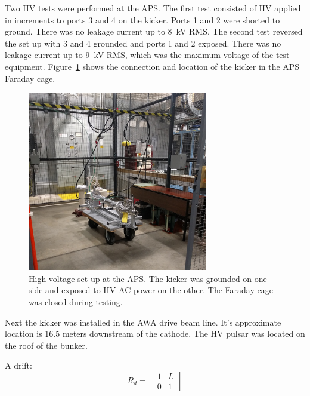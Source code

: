 
Two HV tests were performed at the APS. 
The first test consisted of HV applied in increments to ports 3 and 4 on the kicker.
Ports 1 and 2 were shorted to ground. There was no leakage current up to \SI{8}{kV} RMS.
The second test reversed the set up with 3 and 4 grounded and ports 1 and 2 exposed. 
There was no leakage current up to \SI{9}{kV} RMS, which was the maximum voltage of the test equipment.
Figure~\ref{fig:AWAHVkicker} shows the connection and location of the kicker in the APS Faraday cage.
\begin{figure}%
	\begin{center}
		\includegraphics[width=0.7\textwidth]{./images/kicker1}\caption{High voltage set up at the APS. The kicker was grounded on one side and exposed to HV AC power on the other. The Faraday cage was closed during testing. }
		\label{fig:AWAHVkicker}
	\end{center}
\end{figure}





Next the kicker was installed in the AWA drive beam line.
It's approximate location is 16.5 meters downstream of the cathode.
The HV pulsar was located on the roof of the bunker.




A drift: 
\begin{equation}
R_d = 
\begin{bmatrix}
1 & L \\
0 & 1
\end{bmatrix}
\end{equation}

